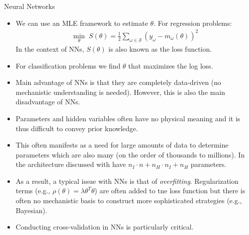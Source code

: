 \documentclass[9pt]{beamer}
\begin{document}
\begin{frame}{Neural Networks}
\begin{itemize}
   \setlength{\itemsep}{5pt}
\item We can use an MLE framework to estimate $\theta$. For regression problems:
\begin{align*}
\min_{\theta}\; S(\theta)=\frac{1}{2}\sum_{\omega\in \mathcal{S}}(y_\omega - m_\omega(\theta))^2
\end{align*}
In the context of NNs, $S(\theta)$ is also known as the loss function.  
\item For classification problems we find $\theta$ that maximizes the log loss. 

\item Main advantage of NNs is that they are completely data-driven (no mechanistic understanding is needed). However, this is also the main disadvantage of NNs. 

\item Parameters and hidden variables often have no physical meaning and it is thus difficult to convey prior knowledge. 

\item This often manifests as a need for large amounts of data to determine parameters which are also many (on the order of thousands to millions). In the architecture discussed with have $n_I\cdot n+n_H\cdot n_I+n_H$ parameters.

\item As a result, a typical issue with NNs is that of {\em overfitting}.  Regularization terms (e.g., $\rho(\theta)=\lambda \theta^T\theta$) are often added to tne loss function but there is often no mechanistic basis to construct more sophisticated strategies (e.g., Bayesian). 

\item Conducting cross-validation in NNs is particularly critical. 

\end{itemize}

\end{frame}
\end{document}
